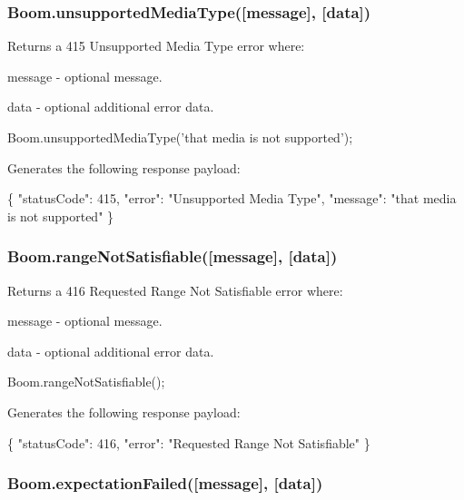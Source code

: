 \subsubsection*{{\ttfamily Boom.\+unsupported\+Media\+Type(\mbox{[}message\mbox{]}, \mbox{[}data\mbox{]})}}

Returns a 415 Unsupported Media Type error where\+:
\begin{DoxyItemize}
\item {\ttfamily message} -\/ optional message.
\item {\ttfamily data} -\/ optional additional error data.
\end{DoxyItemize}


\begin{DoxyCode}
Boom.unsupportedMediaType('that media is not supported');
\end{DoxyCode}


Generates the following response payload\+:


\begin{DoxyCode}
\{
    "statusCode": 415,
    "error": "Unsupported Media Type",
    "message": "that media is not supported"
\}
\end{DoxyCode}


\subsubsection*{{\ttfamily Boom.\+range\+Not\+Satisfiable(\mbox{[}message\mbox{]}, \mbox{[}data\mbox{]})}}

Returns a 416 Requested Range Not Satisfiable error where\+:
\begin{DoxyItemize}
\item {\ttfamily message} -\/ optional message.
\item {\ttfamily data} -\/ optional additional error data.
\end{DoxyItemize}


\begin{DoxyCode}
Boom.rangeNotSatisfiable();
\end{DoxyCode}


Generates the following response payload\+:


\begin{DoxyCode}
\{
    "statusCode": 416,
    "error": "Requested Range Not Satisfiable"
\}
\end{DoxyCode}


\subsubsection*{{\ttfamily Boom.\+expectation\+Failed(\mbox{[}message\mbox{]}, \mbox{[}data\mbox{]})}}

